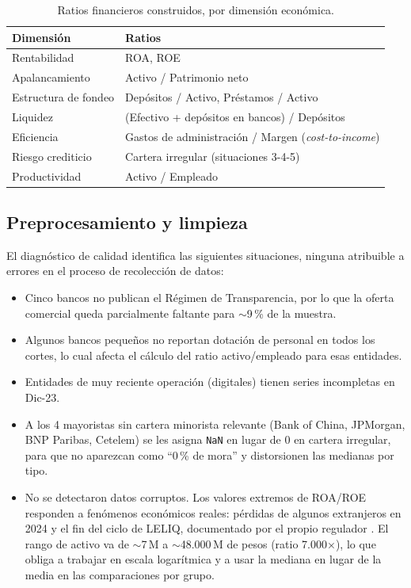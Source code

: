 \documentclass[11pt,a4paper]{article}
\begin{document}
\begin{table}[htbp]
\centering
\caption{Ratios financieros construidos, por dimensión económica.}
\label{tab:ratios}
\small
\begin{tabular}{ll}
\toprule
\textbf{Dimensión} & \textbf{Ratios} \\
\midrule
Rentabilidad & ROA, ROE \\
Apalancamiento & Activo / Patrimonio neto \\
Estructura de fondeo & Depósitos / Activo, Préstamos / Activo \\
Liquidez & (Efectivo + depósitos en bancos) / Depósitos \\
Eficiencia & Gastos de administración / Margen (\textit{cost-to-income}) \\
Riesgo crediticio & Cartera irregular (situaciones 3-4-5) \\
Productividad & Activo / Empleado \\
\bottomrule
\end{tabular}
\end{table}

\subsection{Preprocesamiento y limpieza}

El diagnóstico de calidad identifica las siguientes situaciones, ninguna atribuible a errores en el
proceso de recolección de datos:

\begin{itemize}
  \item Cinco bancos no publican el Régimen de Transparencia, por lo que la oferta comercial queda
  parcialmente faltante para $\sim$9\,\% de la muestra.
  \item Algunos bancos pequeños no reportan dotación de personal en todos los cortes, lo cual afecta
  el cálculo del ratio activo/empleado para esas entidades.
  \item Entidades de muy reciente operación (digitales) tienen series incompletas en Dic-23.
  \item A los 4 mayoristas sin cartera minorista relevante (Bank of China, JPMorgan, BNP Paribas,
  Cetelem) se les asigna \texttt{NaN} en lugar de 0 en cartera irregular, para que no aparezcan como
  ``0\,\% de mora'' y distorsionen las medianas por tipo.
  \item No se detectaron datos corruptos. Los valores extremos de ROA/ROE responden a fenómenos
  económicos reales: pérdidas de algunos extranjeros en 2024 y el fin del ciclo de LELIQ, documentado
  por el propio regulador \citep{bcra2024ief}. El rango de
  activo va de $\sim$7\,M a $\sim$48.000\,M de pesos (ratio 7.000$\times$), lo que obliga a trabajar en
  escala logarítmica y a usar la mediana en lugar de la media en las comparaciones por grupo.
\end{itemize}
\end{document}
